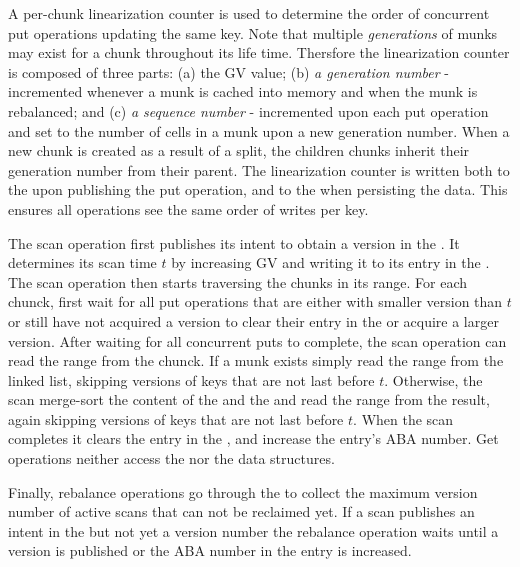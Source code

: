 A per-chunk linearization counter is used to determine the order of concurrent put operations updating the same key.  
Note that multiple \emph{generations} of munks may exist for a chunk throughout its life time.
Thersfore the linearization counter is composed of three parts: (a) the GV value; (b) \emph{a generation number} - incremented whenever a munk is cached into memory and when the munk is rebalanced; and (c) \emph{a sequence number} - incremented upon each put operation and set to the number of cells in a munk upon a new generation number. When a new chunk is created as a result of a split, the children chunks inherit their generation number from their parent. The linearization counter is written both to the  upon publishing the put operation, and to the  when persisting the data. This ensures all operations see the same order of writes per key.

The scan operation first publishes its intent to obtain a version in the . It determines its scan time $t$ by increasing GV and writing it to its entry in the . The scan operation then starts traversing the chunks in its range. For each chunck, first wait for all put operations that are either with smaller version than $t$ or still have not acquired a version to clear their entry in the  or acquire a larger version. After waiting for all concurrent puts to complete, the scan operation can read the range from the chunck. If a munk exists simply read the range from the linked list, skipping versions of keys that are not last before $t$. Otherwise, the scan merge-sort the content of the  and the  and read the range from the result, again skipping versions of keys that are not last before $t$. When the scan completes it clears the entry in the , and increase the entry's ABA number. Get operations neither access the  nor the  data structures.

Finally, rebalance operations go through the  to collect the maximum version number of active scans that can not be reclaimed yet. If a scan publishes an intent in the  but not yet a version number the rebalance operation waits until a version is published or the ABA number in the entry is increased. 

